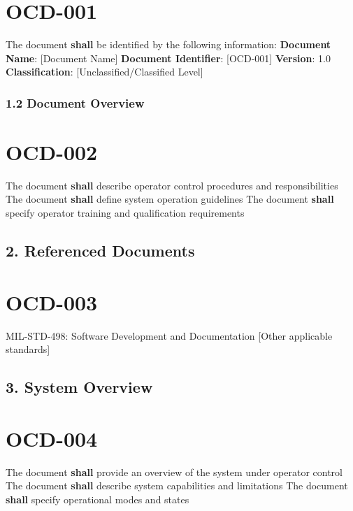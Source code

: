 \section{OCD-001}\label{OCD-001}

The document \textbf{shall} be identified by the following information:
\textbf{Document Name}: [Document Name]
\textbf{Document Identifier}: [OCD-001]
\textbf{Version}: 1.0
\textbf{Classification}: [Unclassified/Classified Level]

\subsubsection{1.2 Document Overview}

\section{OCD-002}\label{OCD-002}

The document \textbf{shall} describe operator control procedures and responsibilities
The document \textbf{shall} define system operation guidelines
The document \textbf{shall} specify operator training and qualification requirements

\subsection{2. Referenced Documents}

\section{OCD-003}\label{OCD-003}

MIL-STD-498: Software Development and Documentation
[Other applicable standards]\\

\subsection{3. System Overview}

\section{OCD-004}\label{OCD-004}

The document \textbf{shall} provide an overview of the system under operator control
The document \textbf{shall} describe system capabilities and limitations
The document \textbf{shall} specify operational modes and states

